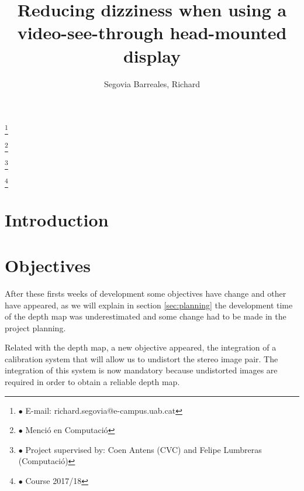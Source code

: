 \documentclass[10pt,a4paper,twocolumn,twoside]{article}
\author{\LARGE\sffamily Segovia Barreales, Richard}
\title{\Huge{\sffamily Reducing dizziness when using a video-see-through head-mounted display}}
\date{}
\newcommand\blfootnote[1]{%
  \begingroup
  \renewcommand\thefootnote{}\footnote{#1}%
  \addtocounter{footnote}{-1}%
  \endgroup
}
\begin{document}
\fancyhead[RO]{\thepage}
\fancyhead[LE]{\thepage}

\fancyfoot[CO,CE]{}

{
   \fancyhf{}
}

\renewcommand{\headrulewidth}{0pt}
\renewcommand{\footrulewidth}{0pt}
\pagestyle{fancy}

\maketitle

\thispagestyle{primerapagina}


\blfootnote{$\bullet$ E-mail: richard.segovia@e-campus.uab.cat}
\blfootnote{$\bullet$ Menció en Computació}
\blfootnote{$\bullet$ Project supervised by: Coen Antens (CVC) and Felipe Lumbreras (Computació)}
\blfootnote{$\bullet$ Course 2017/18}

\section{Introduction}


\section{Objectives}

After these firsts weeks of development some objectives have change and other have appeared, as we will explain in section \ref{sec:planning} the development time of the depth map was underestimated and some change had to be made in the project planning.

Related with the depth map, a new objective appeared, the integration of a calibration system that will allow us to undistort the stereo image pair. The integration of this system is now mandatory because undistorted images are required in order to obtain a reliable depth map.
\end{document}
